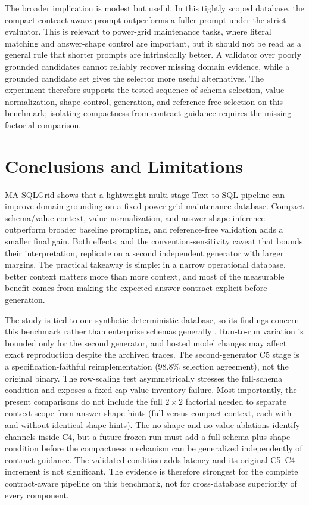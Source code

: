 \documentclass[cmc,article,submit,moreauthors,pdftex]{Definitions/tsp}
\begin{document}
The broader implication is modest but useful. In this tightly scoped database, the compact contract-aware prompt outperforms a fuller prompt under the strict evaluator. This is relevant to power-grid maintenance tasks, where literal matching and answer-shape control are important, but it should not be read as a general rule that shorter prompts are intrinsically better. A validator over poorly grounded candidates cannot reliably recover missing domain evidence, while a grounded candidate set gives the selector more useful alternatives. The experiment therefore supports the tested sequence of schema selection, value normalization, shape control, generation, and reference-free selection on this benchmark; isolating compactness from contract guidance requires the missing factorial comparison.

\section{Conclusions and Limitations}\label{conclusion}

MA-SQLGrid shows that a lightweight multi-stage Text-to-SQL pipeline can improve domain grounding on a fixed power-grid maintenance database. Compact schema/value context, value normalization, and answer-shape inference outperform broader baseline prompting, and reference-free validation adds a smaller final gain. Both effects, and the convention-sensitivity caveat that bounds their interpretation, replicate on a second independent generator with larger margins. The practical takeaway is simple: in a narrow operational database, better context matters more than more context, and most of the measurable benefit comes from making the expected answer contract explicit before generation.

The study is tied to one synthetic deterministic database, so its findings concern this benchmark rather than enterprise schemas generally \cite{zhong2020semantic,lei2024spider}. Run-to-run variation is bounded only for the second generator, and hosted model changes may affect exact reproduction despite the archived traces. The second-generator C5 stage is a specification-faithful reimplementation (98.8\% selection agreement), not the original binary. The row-scaling test asymmetrically stresses the full-schema condition and exposes a fixed-cap value-inventory failure. Most importantly, the present comparisons do not include the full $2\times2$ factorial needed to separate context scope from answer-shape hints (full versus compact context, each with and without identical shape hints). The no-shape and no-value ablations identify channels inside C4, but a future frozen run must add a full-schema-plus-shape condition before the compactness mechanism can be generalized independently of contract guidance. The validated condition adds latency and its original C5--C4 increment is not significant. The evidence is therefore strongest for the complete contract-aware pipeline on this benchmark, not for cross-database superiority of every component.
\end{document}
